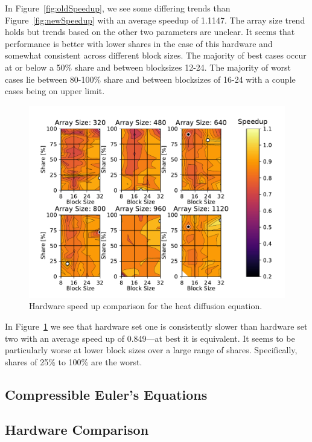 \documentclass[review]{elsarticle}
\begin{document}
In Figure~\ref{fig:oldSpeedup}, we see some differing trends than Figure~\ref{fig:newSpeedup} with an average speedup of 1.1147. The array size trend holds but trends based on the other two parameters are unclear. It seems that performance is better with lower shares in the case of this hardware and somewhat consistent across different block sizes. The majority of best cases occur at or below a 50\% share and between blocksizes 12-24. The majority of worst cases lie between 80-100\% share and between blocksizes of 16-24 with a couple cases being on upper limit.

\begin{figure}[htb!]
    \centering
    \includegraphics[scale=0.7]{figs/hardwareSpeedupheat.pdf}
    \caption{Hardware speed up comparison for the heat diffusion equation.}
    \label{fig:heatHardwareComp}
\end{figure}

In Figure~\ref{fig:heatHardwareComp} we see that hardware set one is consistently slower than hardware set two with an average speed up of 0.849---at best it is equivalent. It seems to be particularly worse at lower block sizes over a large range of shares. Specifically, shares of 25\% to 100\% are the worst.


\subsection{Compressible Euler's Equations}
\label{eulerVortexResults}


\subsection{Hardware Comparison}
\label{hardwareResults}
\end{document}
